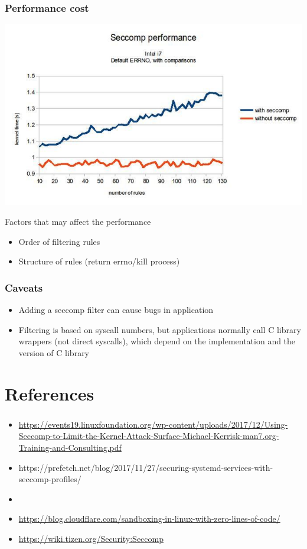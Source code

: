 \documentclass[usenames,dvipsnames]{beamer}
\newcommand{\codeinline}[1] {\texttt{\smaller[2]{#1}}}
\begin{document}
\begin{frame}[fragile]
\frametitle{Performance cost}
\centering
\includegraphics[scale=0.3]{images/672px-Seccomp_i7_extended_errno.jpg}

\raggedright

Factors that may affect the performance
  \begin{itemize}
    \item Order of filtering rules
    \item Structure of rules (return errno/kill process)
  \end{itemize}
\end{frame}

\begin{frame}
\frametitle{Caveats}
\begin{itemize}
\item Adding a seccomp filter can cause bugs in application
\item Filtering is based on syscall numbers, but applications normally call C library wrappers (not direct syscalls), which depend on the implementation and the version of C library
\end{itemize}
\end{frame}

\section{References}
\begin{frame}
\frametitle{\secname}
\footnotesize
\begin{itemize}
	\item \url{https://events19.linuxfoundation.org/wp-content/uploads/2017/12/Using-Seccomp-to-Limit-the-Kernel-Attack-Surface-Michael-Kerrisk-man7.org-Training-and-Consulting.pdf}
  \item https://prefetch.net/blog/2017/11/27/securing-systemd-services-with-seccomp-profiles/
  \item \codeinline{man 2 seccomp}
  \item \url{https://blog.cloudflare.com/sandboxing-in-linux-with-zero-lines-of-code/}
  \item \url{https://wiki.tizen.org/Security:Seccomp}
\end{itemize}
\end{frame}

\end{document}
